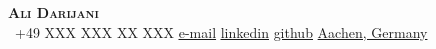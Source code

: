 \begin{center}
    \textbf{\Huge \scshape Ali Darijani} \\ \vspace{1pt}
     \ \small +49 XXX XXX XX XXX \quad
    \href{mailto:ali.darijani.me@gmail.com}{ \underline{e-mail}} \quad
    \href{https://www.linkedin.com/in/ali-darijani}{ \underline{linkedin}} \quad
    \href{https://github.com/adarijani}{ \underline{github}} \quad
    \href{https://maps.app.goo.gl/WtiUZyvrgix4fDJk8}{Aachen, Germany}
\end{center}